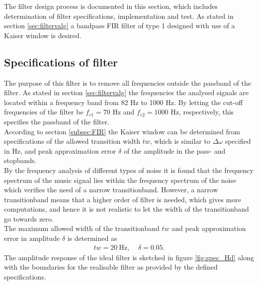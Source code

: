 The filter design process is documented in this section, which includes determination of filter specifications, implementation and test. As stated in section \ref{sec:filtervalg} a bandpass FIR filter of type 1 designed with use of a Kaiser window is desired.

\subsection{Specifications of filter} \label{sec:FIRspec} 
The purpose of this filter is to remove all frequencies outside the passband of the filter. As stated in section \ref{sec:filtervalg} the frequencies the analysed signals are located within a frequency band from 82 Hz to 1000 Hz.  
By letting the cut-off frequencies of the filter be $f_{c1}=70$ Hz and $f_{c2}=1000$ Hz, respectively, this specifies the passband of the filter. \\
According to section \ref{subsec:FIR} the Kaiser window can be determined from specifications of the allowed transition width $tw$, which is similar to $\Delta \omega$ specified in Hz, and peak approximation error $\delta$ of the amplitude in the pass- and stopbands. \\ 
By the frequency analysis of different types of noise it is found that the frequency spectrum of the music signal lies within the frequency spectrum of the noise which verifies the need of a narrow transitionband. However, a narrow transitionband means that a higher order of filter is needed, which gives more computations, and hence it is not realistic to let the width of the transitionband go towards zero.  \\
The maximum allowed width of the transitionband $tw$ and peak approximation error in amplitude $\delta$ is determined as
\begin{align}
tw = 20 \ \text{Hz}, \ \ \ \ \  \delta = 0.05. 
\end{align}
The amplitude response of the ideal filter is sketched in figure \ref{fig:spec_Hd} along with the boundaries for the realisable filter as provided by the defined specifications.      

